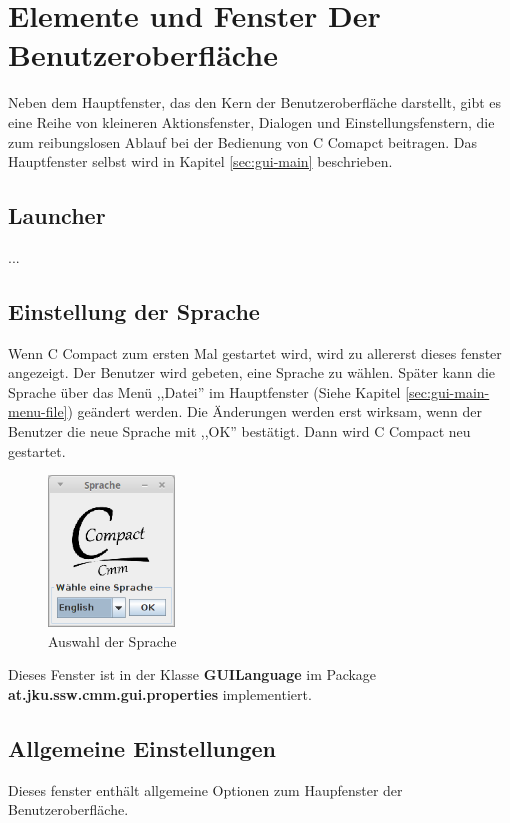 \section{Elemente und Fenster Der Benutzeroberfläche}
Neben dem Hauptfenster, das den Kern der Benutzeroberfläche darstellt, gibt es eine Reihe von kleineren Aktionsfenster, Dialogen und Einstellungsfenstern, die zum reibungslosen Ablauf bei der Bedienung von C Comapct beitragen. Das Hauptfenster selbst wird in Kapitel \ref{sec:gui-main} beschrieben.

\subsection{Launcher}
...

\subsection{Einstellung der Sprache}
Wenn C Compact zum ersten Mal gestartet wird, wird zu allererst dieses fenster angezeigt. Der Benutzer wird gebeten, eine Sprache zu wählen. Später kann die Sprache über das Menü ,,Datei'' im Hauptfenster (Siehe Kapitel \ref{sec:gui-main-menu-file}) geändert werden. Die Änderungen werden erst wirksam, wenn der Benutzer die neue Sprache mit ,,OK'' bestätigt. Dann wird C Compact neu gestartet.

\begin{figure}[htp]
\centering
\includegraphics[width=0.3\textwidth]{./media/images/gui/elements/Bildschirmfoto-Sprache.png}
\caption{Auswahl der Sprache}
\label{fig:win-lang}
\end{figure}

Dieses Fenster ist in der Klasse \textbf{GUILanguage} im Package \textbf{at.jku.ssw.cmm.gui.properties} implementiert. 

\subsection{Allgemeine Einstellungen}
Dieses fenster enthält allgemeine Optionen zum Haupfenster der Benutzeroberfläche.



